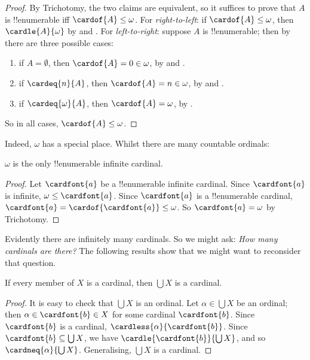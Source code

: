 \documentclass[../../../include/open-logic-section]{subfiles}
\begin{document}
\begin{proof}
	By Trichotomy, the two claims are equivalent, so it suffices to prove that $A$ is !!{enumerable} iff $\cardof{A} \leq \omega$. For \emph{right-to-left}: if $\cardof{A} \leq \omega$, then $\cardle{A}{\omega}$ by  and . For \emph{left-to-right}: suppose $A$ is !!{enumerable}; then by  there are three possible cases:
	\begin{enumerate}
		\item if $A = \emptyset$, then $\cardof{A} = 0 \in \omega$, by  and .
		\item if $\cardeq{n}{A}$, then $\cardof{A} = n \in \omega$, by  and .
		\item if $\cardeq{\omega}{A}$, then $\cardof{A} = \omega$, by .
	\end{enumerate}
	So in all cases, $\cardof{A} \leq \omega$. 
\end{proof}\noindent
Indeed, $\omega$ has a special place. Whilst there are many countable ordinals:
\begin{cor}
	$\omega$ is the only !!{enumerable} infinite cardinal.
\end{cor}
\begin{proof}
	Let $\cardfont{a}$ be a !!{enumerable} infinite cardinal. Since $\cardfont{a}$ is infinite, $\omega \leq \cardfont{a}$. Since $\cardfont{a}$ is a !!{enumerable} cardinal, $\cardfont{a} = \cardof{\cardfont{a}} \leq \omega$. So $\cardfont{a} = \omega$ by Trichotomy.
\end{proof}\noindent
Evidently there are infinitely many cardinals. So we might ask: \emph{How many cardinals are there?} The following results show that we might want to reconsider that question.
\begin{prop}
	If every member of $X$ is a cardinal, then $\bigcup X$ is a cardinal.
\end{prop}
\begin{proof}
	It is easy to check that $\bigcup X$ is an ordinal. Let $\alpha \in \bigcup X$ be an ordinal; then $\alpha \in \cardfont{b} \in X$ for some cardinal $\cardfont{b}$. Since $\cardfont{b}$ is a cardinal, $\cardless{\alpha}{\cardfont{b}}$. Since $\cardfont{b} \subseteq \bigcup X$, we have $\cardle{\cardfont{b}}{\bigcup X}$, and so $\cardneq{\alpha}{\bigcup X}$. Generalising, $\bigcup X$ is a cardinal.
\end{proof} 
\end{document}
